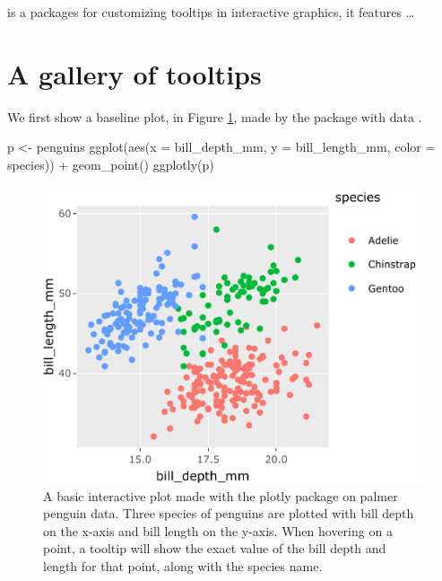  is a packages for customizing tooltips in interactive
graphics, it features \ldots{}

\hypertarget{a-gallery-of-tooltips}{%
\section{A gallery of tooltips}\label{a-gallery-of-tooltips}}

We first show a baseline plot, in Figure \ref{fig:penguins-plotly}, made
by the  package with  data
\citep{palmerpenguins}.

\begin{Schunk}
\begin{Sinput}
p <- penguins %
  ggplot(aes(x = bill_depth_mm, y = bill_length_mm, 
             color = species)) + 
  geom_point()
ggplotly(p)
\end{Sinput}
\begin{figure}
\includegraphics{sample-article_files/figure-latex/penguins-plotly-1} \caption[A basic interactive plot made with the plotly package on palmer penguin data]{A basic interactive plot made with the plotly package on palmer penguin data. Three species of penguins are plotted with bill depth on the x-axis and bill length on the y-axis. When hovering on a point, a tooltip will show the exact value of the bill depth and length for that point, along with the species name.}\label{fig:penguins-plotly}
\end{figure}
\end{Schunk}

